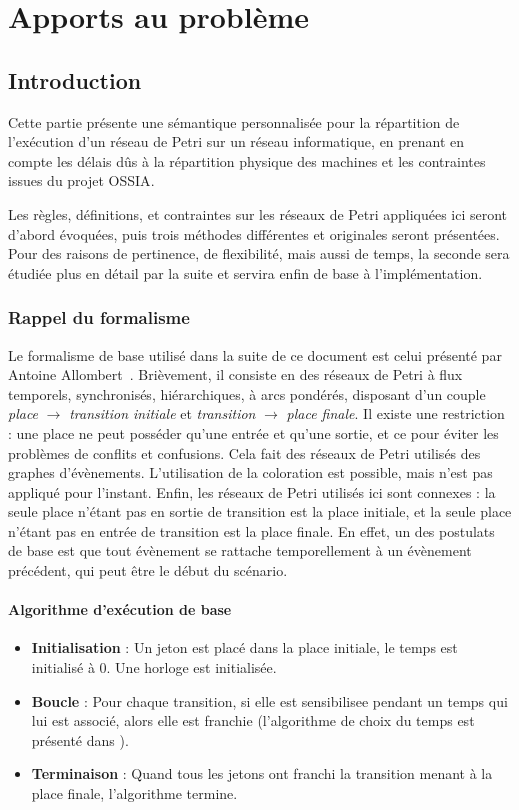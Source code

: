 \chapter{Apports au problème}
\label{chapterApports}
\section{Introduction}
Cette partie présente une sémantique personnalisée pour la répartition de l'exécution d'un réseau de Petri sur un réseau informatique, en prenant en compte les délais dûs à la répartition physique des machines et les contraintes issues du projet \ac{OSSIA}.

Les règles, définitions, et contraintes sur les réseaux de Petri appliquées ici seront d'abord évoquées, puis trois méthodes différentes et originales seront présentées. Pour des raisons de pertinence, de flexibilité, mais aussi de temps, la seconde sera étudiée plus en détail par la suite et servira enfin de base à l'implémentation.  

\subsection{Rappel du formalisme}
Le formalisme de base utilisé dans la suite de ce document est celui présenté par Antoine Allombert~\cite[p. 146]{allombert2009aspects}. Brièvement, il consiste en des réseaux de Petri à flux temporels, synchronisés, hiérarchiques, à arcs pondérés, disposant d'un couple \textit{place} $\rightarrow$ \textit{transition initiale} et \textit{transition} $\rightarrow$ \textit{place finale}. 
Il existe une restriction : une place ne peut posséder qu'une entrée et qu'une sortie, et ce pour éviter les problèmes de conflits et confusions. Cela fait des réseaux de Petri utilisés des graphes d'évènements\cite[p.~7--9]{david2010discrete}. L'utilisation de la coloration est possible, mais n'est pas appliqué pour l'instant. 
Enfin, les réseaux de Petri utilisés ici sont connexes : la seule place n'étant pas en sortie de transition est la place initiale, et la seule place n'étant pas en entrée de transition est la place finale. En effet, un des postulats de base est que tout évènement se rattache temporellement à un évènement précédent, qui peut être le début du scénario.

\subsubsection{Algorithme d'exécution de base}
\begin{itemize}
\item \textbf{Initialisation} : Un jeton est placé dans la place initiale, le temps est initialisé à 0. Une horloge est initialisée.
\item \textbf{Boucle} : Pour chaque transition, si elle est \gls{sensibilisee} pendant un temps qui lui est associé, alors elle est \gls{franchie} (l'algorithme de choix du temps est présenté dans \cite[p. 148]{allombert2009aspects}).
\item \textbf{Terminaison} : Quand tous les jetons ont franchi la transition menant à la place finale, l'algorithme termine.
\end{itemize}
